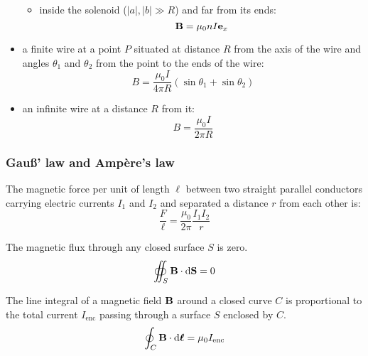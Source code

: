 \documentclass[../../../main_physics.tex]{subfiles}
\begin{document}
\begin{multicols}{2}
\begin{proposition}
\begin{itemize}
\begin{itemize}
\begin{center}
\begin{minipage}{\linewidth}
                      \end{minipage}
                    \end{center}
              \item inside the solenoid ($|a|,|b|\gg R$) and far from its ends: $$\boldsymbol{\mathrm{B}}=\mu_0 nI\boldsymbol{\mathrm{e}}_x$$
            \end{itemize}
      \item a finite wire at a point $P$ situated at distance $R$ from the axis of the wire and angles $\theta_1$ and $\theta_2$ from the point to the ends of the wire: $$B=\frac{\mu_0I}{4\pi R}(\sin\theta_1+\sin\theta_2)$$
            \begin{center}
              \begin{minipage}{\linewidth}
                \centering
                
              \end{minipage}
            \end{center}
      \item an infinite wire at a distance $R$ from it: $$B=\frac{\mu_0I}{2\pi R}$$
    \end{itemize}
  \end{proposition}
  \subsubsection{Gau\ss' law and Ampère's law}
  \begin{proposition}
    The magnetic force per unit of length $\ell$ between two straight parallel conductors carrying electric currents $I_1$ and $I_2$ and separated a distance $r$ from each other is: $$\frac{F}{\ell}=\frac{\mu_0}{2\pi}\frac{I_1I_2}{r}$$
  \end{proposition}
  \begin{law}
    The magnetic flux through any closed surface $S$ is zero.
    $$\oiint_S\boldsymbol{\mathrm{B}}\cdot\dd{\boldsymbol{\mathrm{S}}}=0$$
  \end{law}
  \begin{law}
    The line integral of a magnetic field $\boldsymbol{\mathrm{B}}$ around a closed curve $C$ is proportional to the total current $I_\text{enc}$ passing through a surface $S$ enclosed by $C$.
    $$\oint_C\boldsymbol{\mathrm{B}}\cdot\dd{\boldsymbol{\mathrm{\ell}}}=\mu_0I_\text{enc}$$
  \end{law}

\end{multicols}
\end{document}
